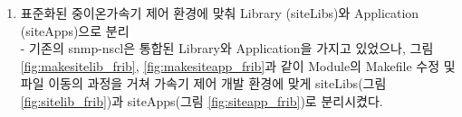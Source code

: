 \documentclass[11pt
  , a4paper
  , article
  , oneside
]{memoir}
\begin{document}
\begin{enumerate}
\item 표준화된 중이온가속기 제어 환경에 맞춰 Library (siteLibs)와 Application (siteApps)으로 분리\\
- 기존의 snmp-nscl은 통합된 Library와 Application을 가지고 있었으나, 그림 \ref{fig:makesitelib_frib}, \ref{fig:makesiteapp_frib}과 같이 Module의 Makefile 수정 및 파일 이동의 과정을 거쳐 가속기 제어 개발 환경에 맞게 siteLibs(그림 \ref{fig:sitelib_frib})과 siteApps(그림 \ref{fig:siteapp_frib})로 분리시켰다.

\begin{figure}[!h]
  \centering
              \hfill
              \hfill
            

\end{figure}
\end{enumerate}
\end{document}
